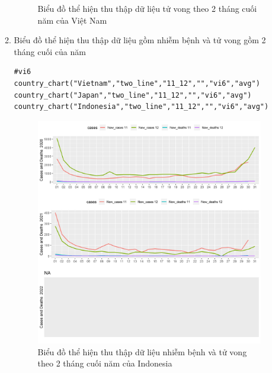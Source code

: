 \documentclass[a4paper]{article}
\theoremstyle{definition}
\begin{document}
\begin{enumerate}[i)]
\begin{enumerate}[1)]
\begin{figure}[htp]
		    \caption{Biểu đồ thể hiện thu thập dữ liệu tử vong theo 2 tháng cuối năm của Việt Nam}
		    \label{fig:my_label}
		 \end{figure}
		 \newpage
    \item Biểu đồ thể hiện thu thập dữ liệu gồm nhiễm bệnh và tử vong gồm 2 tháng cuối của năm
   \begin{lstlisting}[frame=single]  
#vi6
country_chart("Vietnam","two_line","11_12","","vi6","avg")
country_chart("Japan","two_line","11_12","","vi6","avg")
country_chart("Indonesia","two_line","11_12","","vi6","avg")
		\end{lstlisting}	
		\begin{figure}[htp]
		    \centering
		    \includegraphics[scale = 0.7]{Images/VI/vi6 Indonesia .jpeg}
		    \caption{Biểu đồ thể hiện thu thập dữ liệu nhiễm bệnh và tử vong theo 2 tháng cuối năm của Indonesia}
		    \label{fig:my_label}
		\end{figure}
		\begin{figure}[htp]
		    \centering

\end{figure}
\end{enumerate}
\end{enumerate}
\end{document}
